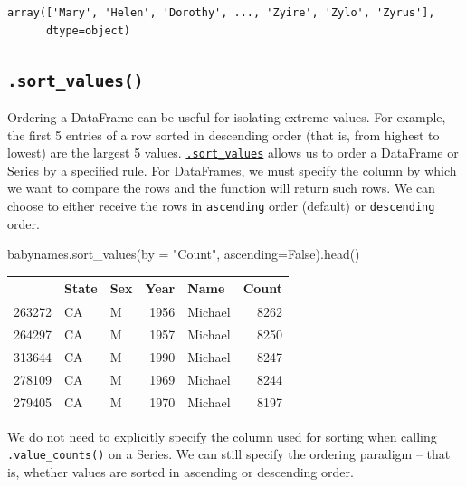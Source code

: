 \documentclass[
  letterpaper,
  DIV=11,
  numbers=noendperiod]{scrreprt}
\newenvironment{Shaded}{\begin{snugshade}}{\end{snugshade}}
\newcommand{\NormalTok}[1]{\textcolor[rgb]{0.00,0.23,0.31}{#1}}
\newcommand{\OperatorTok}[1]{\textcolor[rgb]{0.37,0.37,0.37}{#1}}
\newcommand{\StringTok}[1]{\textcolor[rgb]{0.13,0.47,0.30}{#1}}
\newcommand{\VariableTok}[1]{\textcolor[rgb]{0.07,0.07,0.07}{#1}}
\begin{document}
\begin{verbatim}
array(['Mary', 'Helen', 'Dorothy', ..., 'Zyire', 'Zylo', 'Zyrus'],
      dtype=object)
\end{verbatim}

\hypertarget{sort_values}{%
\subsection{\texorpdfstring{\texttt{.sort\_values()}}{.sort\_values()}}\label{sort_values}}

Ordering a DataFrame can be useful for isolating extreme values. For
example, the first 5 entries of a row sorted in descending order (that
is, from highest to lowest) are the largest 5 values.
\href{https://pandas.pydata.org/docs/reference/api/pandas.DataFrame.sort_values.html}{\texttt{.sort\_values}}
allows us to order a DataFrame or Series by a specified rule. For
DataFrames, we must specify the column by which we want to compare the
rows and the function will return such rows. We can choose to either
receive the rows in \texttt{ascending} order (default) or
\texttt{descending} order.

\begin{Shaded}
\begin{Highlighting}[]
\NormalTok{babynames.sort\_values(by }\OperatorTok{=} \StringTok{"Count"}\NormalTok{, ascending}\OperatorTok{=}\VariableTok{False}\NormalTok{).head()}
\end{Highlighting}
\end{Shaded}

\begin{tabular}{lllrlr}
\toprule
{} & State & Sex &  Year &     Name &  Count \\
\midrule
263272 &    CA &   M &  1956 &  Michael &   8262 \\
264297 &    CA &   M &  1957 &  Michael &   8250 \\
313644 &    CA &   M &  1990 &  Michael &   8247 \\
278109 &    CA &   M &  1969 &  Michael &   8244 \\
279405 &    CA &   M &  1970 &  Michael &   8197 \\
\bottomrule
\end{tabular}

We do not need to explicitly specify the column used for sorting when
calling \texttt{.value\_counts()} on a Series. We can still specify the
ordering paradigm -- that is, whether values are sorted in ascending or
descending order.
\end{document}
